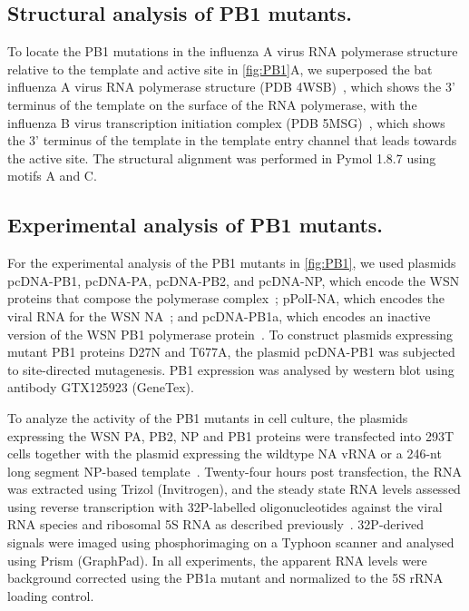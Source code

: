 \documentclass[]{asm-article}
\newcommand{\FIG}[1]{\autoref{fig:#1}}
\begin{document}
\subsection{Structural analysis of PB1 mutants.}
To locate the PB1 mutations in the influenza A virus RNA polymerase structure relative to the template and active site in \FIG{PB1}A, we superposed the bat influenza A virus RNA polymerase structure (PDB 4WSB)~\cite{reich2014structural}, which shows the 3' terminus of the template on the surface of the RNA polymerase, with the influenza B virus transcription initiation complex (PDB 5MSG)~\cite{reich2017vitro}, which shows the 3' terminus of the template in the template entry channel that leads towards the active site.
The structural alignment was performed in Pymol 1.8.7 using motifs A and C.

\subsection{Experimental analysis of PB1 mutants.}
For the experimental analysis of the PB1 mutants in \FIG{PB1}, we used plasmids pcDNA-PB1, pcDNA-PA, pcDNA-PB2, and pcDNA-NP, which encode the WSN proteins that compose the polymerase complex~\cite{fodor2002single}; pPolI-NA, which encodes the viral RNA for the WSN NA~\cite{fodor2002single}; and pcDNA-PB1a, which encodes an inactive version of the WSN PB1 polymerase protein~\cite{vreede2004model}. 
To construct plasmids expressing mutant PB1 proteins D27N and T677A, the plasmid pcDNA-PB1 was subjected to site-directed mutagenesis. 
PB1 expression was analysed by western blot using antibody GTX125923 (GeneTex).

To analyze the activity of the PB1 mutants in cell culture, the plasmids expressing the WSN PA, PB2, NP and PB1 proteins were transfected into 293T cells together with the plasmid expressing the wildtype NA vRNA or a 246-nt long segment NP-based template~\cite{velthuis2018mini}.
Twenty-four hours post transfection, the RNA was extracted using Trizol (Invitrogen), and the steady state RNA levels assessed using reverse transcription with 32P-labelled oligonucleotides against the viral RNA species and ribosomal 5S RNA as described previously~\cite{velthuis2018mini, velthuis2016role}.
32P-derived signals were imaged using phosphorimaging on a Typhoon scanner and analysed using Prism (GraphPad).
In all experiments, the apparent RNA levels were background corrected using the PB1a mutant and normalized to the 5S rRNA loading control.
\end{document}
